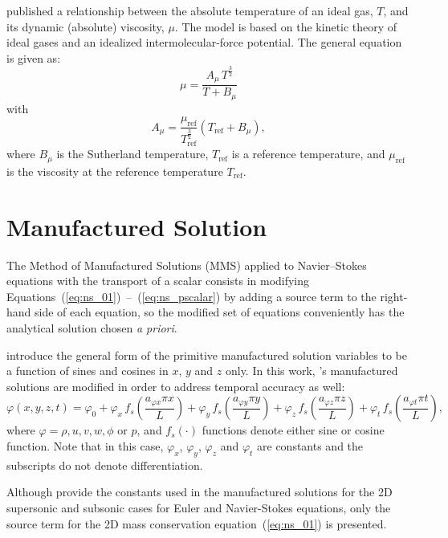 \documentclass[10pt]{article}
\begin{document}
\citet{Sutherland1893} published a relationship between the absolute temperature of an ideal gas, $T$,  and its dynamic (absolute) viscosity, $\mu$. The model is based on the kinetic theory of ideal gases and an idealized intermolecular-force potential. The general equation is given as:
\begin{equation}
\label{eq:Sutherland01}
 \mu  =\dfrac{A_\mu \, T^{\frac{3}{2}}}{T+B_\mu}
\end{equation}
with
$$    A_\mu = \dfrac{\mu_\text{ref}}{T_{\text{ref}}^{\frac{3}{2}}}(T_\text{ref} + B_\mu), $$
%
where $B_\mu$ is the Sutherland temperature, $T_{\text{ref}}$ is a reference temperature,  and $\mu_\text{ref}$ is the viscosity at the reference temperature $T_\text{ref}$.


\section{Manufactured Solution}

The Method of Manufactured Solutions (MMS) applied to Navier--Stokes equations with the transport of a scalar consists in modifying Equations~(\ref{eq:ns_01})~--~(\ref{eq:ns_pscalar}) by adding a source term to the right-hand side of each equation, so the modified set of equations conveniently has the analytical solution chosen \textit{a priori}.

\citet{Roy2002} introduce the general form of the primitive manufactured solution variables to be  a function of sines and cosines in $x$, $y$ and $z$ only. In this work, \citet{Roy2002}'s manufactured solutions are modified in order to address temporal accuracy as well:
\begin{equation}
 \label{eq:manufactured01}
  \varphi (x,y,z,t) = \varphi_0+ \varphi_x\, f_s \left(\frac{a_{\varphi x} \pi x}{L} \right) +  \varphi_y \,f_s\left(\frac{a_{\varphi y} \pi y}{L}\right) + \varphi_z \,f_s\left(\frac{a_{\varphi z} \pi z}{L}\right)+ \varphi_t \,f_s\left(\frac{a_{\varphi t} \pi t}{L}\right),
\end{equation}
where $\varphi=\rho,u,v,w, \phi$ or $p$, and $f_s(\cdot)$ functions denote either sine or cosine function. Note that in this case, $\varphi_x$, $\varphi_y$, $\varphi_z$  and $\varphi_t$ are constants  and the subscripts do not denote differentiation.



Although \citet{Roy2002} provide the constants used in the manufactured solutions for the 2D supersonic and subsonic cases for Euler and Navier-Stokes equations, only the source term for the 2D mass conservation equation~(\ref{eq:ns_01}) is presented.
\end{document}
